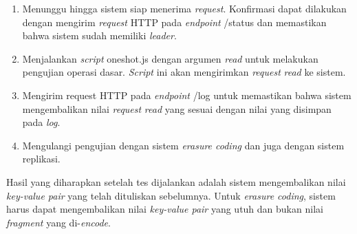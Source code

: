 \begin{enumerate}
	\item Menunggu hingga sistem siap menerima \textit{request}. Konfirmasi dapat dilakukan dengan mengirim \textit{request} HTTP pada \textit{endpoint} /status dan memastikan bahwa sistem sudah memiliki \textit{leader}.
	\item Menjalankan \textit{script} oneshot.js dengan argumen \textit{read} untuk melakukan pengujian operasi dasar. \textit{Script} ini akan mengirimkan \textit{request} \textit{read} ke sistem.
	\item Mengirim request HTTP pada \textit{endpoint} /log untuk memastikan bahwa sistem mengembalikan nilai \textit{request} \textit{read} yang sesuai dengan nilai yang disimpan pada \textit{log}.
	\item Mengulangi pengujian dengan sistem \textit{erasure coding} dan juga dengan sistem replikasi.
\end{enumerate}

Hasil yang diharapkan setelah tes dijalankan adalah sistem mengembalikan nilai \textit{key-value pair} yang telah dituliskan sebelumnya. Untuk \textit{erasure coding}, sistem harus dapat mengembalikan nilai \textit{key-value pair} yang utuh dan bukan nilai \textit{fragment} yang di-\textit{encode}.